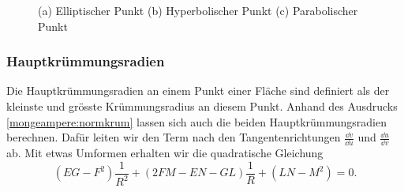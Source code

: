 \begin{figure}
	\centering
	\caption{(a) Elliptischer Punkt (b) Hyperbolischer Punkt  (c) Parabolischer Punkt}
	\label{mongeampere:arten}\end{figure}
\subsubsection{Hauptkrümmungsradien}
Die Hauptkrümmungsradien an einem Punkt einer Fläche sind definiert als der kleinste und grösste Krümmungsradius an diesem Punkt.
Anhand des Ausdrucks \eqref{mongeampere:normkrum} lassen sich auch die beiden Hauptkrümmungsradien berechnen.
Dafür leiten wir den Term nach den Tangentenrichtungen $\frac{\dd v}{\dd u}$ und $\frac{\dd u}{\dd v}$ ab.
Mit etwas Umformen erhalten wir die quadratische Gleichung
\begin{equation}
  (EG - F^2)\frac{1}{R^2} + (2FM - EN - GL)\frac{1}{R} + (LN-M^2) = 0.
  \label{mongeampere:mainkrum}
\end{equation}


